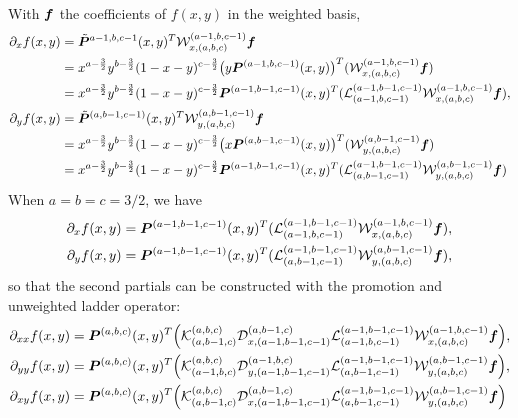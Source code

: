 With $\boldsymbol{f}$ the coefficients of $f(x,y)$ in the weighted basis, 
\begin{align*}
	\partial_x f(x,y) &= \tilde{\boldsymbol{P}}^{a-1,b,c-1}(x,y)^T \mathcal{W}_{x,(a,b,c)}^{(a-1,b,c-1)}\boldsymbol{f} \\
	& = x^{a-\frac{3}{2}}y^{b-\frac{3}{2}}(1-x-y)^{c-\frac{3}{2}}\big(y\boldsymbol{P}^{(a-1,b,c-1)}(x,y)\big)^T(\mathcal{W}_{x,(a,b,c)}^{(a-1,b,c-1)}\boldsymbol{f})\\
	&= x^{a-\frac{3}{2}}y^{b-\frac{3}{2}}(1-x-y)^{c-\frac{3}{2}}\boldsymbol{P}^{(a-1,b-1,c-1)}(x,y)^T(\mathcal{L}_{(a-1,b,c-1)}^{(a-1,b-1,c-1)}\mathcal{W}_{x,(a,b,c)}^{(a-1,b,c-1)}\boldsymbol{f}),\\
	\partial_y f(x,y) &= \tilde{\boldsymbol{P}}^{(a,b-1,c-1)}(x,y)^T \mathcal{W}_{y,(a,b,c)}^{(a,b-1,c-1)}\boldsymbol{f} \\
	&= x^{a-\frac{3}{2}}y^{b-\frac{3}{2}}(1-x-y)^{c-\frac{3}{2}}\big(x\boldsymbol{P}^{(a,b-1,c-1)}(x,y)\big)^T(\mathcal{W}_{y,(a,b,c)}^{(a,b-1,c-1)}\boldsymbol{f})\\
	&=x^{a-\frac{3}{2}}y^{b-\frac{3}{2}}(1-x-y)^{c-\frac{3}{2}}\boldsymbol{P}^{(a-1,b-1,c-1)}(x,y)^T(\mathcal{L}_{(a,b-1,c-1)}^{(a-1,b-1,c-1)}\mathcal{W}_{y,(a,b,c)}^{(a,b-1,c-1)}\boldsymbol{f})
\end{align*}
When $a=b=c=3/2$, we have 
\begin{align*}
	\partial_x f(x,y) &=  \boldsymbol{P}^{(a-1,b-1,c-1)}(x,y)^T(\mathcal{L}_{(a-1,b,c-1)}^{(a-1,b-1,c-1)}\mathcal{W}_{x,(a,b,c)}^{(a-1,b,c-1)}\boldsymbol{f}),\\
\partial_yf(x,y) &= \boldsymbol{P}^{(a-1,b-1,c-1)}(x,y)^T(\mathcal{L}_{(a,b-1,c-1)}^{(a-1,b-1,c-1)}\mathcal{W}_{y,(a,b,c)}^{(a,b-1,c-1)}\boldsymbol{f}),
\end{align*}
so that the second partials can be constructed with the promotion and unweighted ladder operator:
\begin{align}
	\partial_{xx}f(x,y) &= \boldsymbol{P}^{(a,b,c)}(x,y)^T\Big( \mathcal{K}_{(a,b-1,c)}^{(a,b,c)}\mathcal{D}_{x,(a-1,b-1,c-1)}^{(a,b-1,c)}\mathcal{L}_{(a-1,b,c-1)}^{(a-1,b-1,c-1)}\mathcal{W}_{x,(a,b,c)}^{(a-1,b,c-1)}\boldsymbol{f}\Big),\\
	\partial_{yy}f(x,y) &= \boldsymbol{P}^{(a,b,c)}(x,y)^T\Big( \mathcal{K}_{(a-1,b,c)}^{(a,b,c)}\mathcal{D}_{y,(a-1,b-1,c-1)}^{(a-1,b,c)}\mathcal{L}_{(a,b-1,c-1)}^{(a-1,b-1,c-1)}\mathcal{W}_{y,(a,b,c)}^{(a,b-1,c-1)}\boldsymbol{f}\Big),\\
	\partial_{xy}f(x,y) &= \boldsymbol{P}^{(a,b,c)}(x,y)^T\Big(\mathcal{K}_{(a,b-1,c)}^{(a,b,c)}\mathcal{D}_{x,(a-1,b-1,c-1)}^{(a,b-1,c)}\mathcal{L}_{(a,b-1,c-1)}^{(a-1,b-1,c-1)}\mathcal{W}_{y,(a,b,c)}^{(a,b-1,c-1)}\boldsymbol{f}\Big)
\end{align}
